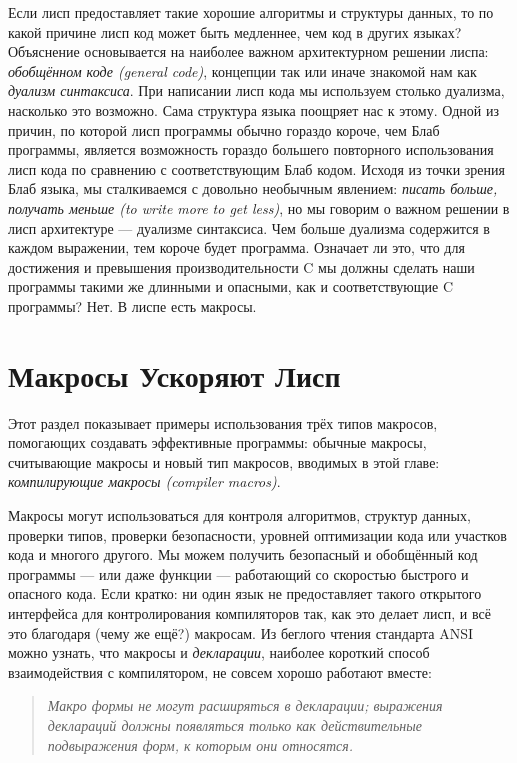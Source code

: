 Если лисп предоставляет такие хорошие алгоритмы и структуры данных, то по какой причине лисп код может быть медленнее, чем код в других языках? Объяснение основывается на наиболее важном архитектурном решении лиспа: \emph{обобщённом коде (general code)}, концепции так или иначе знакомой нам как \emph{дуализм синтаксиса}. При написании лисп кода мы используем столько дуализма, насколько это возможно. Сама структура языка поощряет нас к этому. Одной из причин, по которой лисп программы обычно гораздо короче, чем Блаб программы, является возможность гораздо большего повторного использования лисп кода по сравнению с соответствующим Блаб кодом. Исходя из точки зрения Блаб языка, мы сталкиваемся с довольно необычным явлением: \emph{писать больше, получать меньше (to write more to get less)}, но мы говорим о важном решении в лисп архитектуре --- дуализме синтаксиса. Чем больше дуализма содержится в каждом выражении, тем короче будет программа. Означает ли это, что для достижения и превышения производительности C мы должны сделать наши программы такими же длинными и опасными, как и соответствующие C программы? Нет. В лиспе есть макросы.

\section{Макросы Ускоряют Лисп}\label{section_macros_make_lisp_fast}

Этот раздел показывает примеры использования трёх типов макросов, помогающих создавать эффективные программы: обычные макросы, считывающие макросы и новый тип макросов, вводимых в этой главе: \emph{компилирующие макросы (compiler macros)}.

Макросы могут использоваться для контроля алгоритмов, структур данных, проверки типов, проверки безопасности, уровней оптимизации кода или участков кода и многого другого. Мы можем получить безопасный и обобщённый код программы --- или даже функции --- работающий со скоростью быстрого и опасного кода. Если кратко: ни один язык не предоставляет такого открытого интерфейса для контролирования компиляторов так, как это делает лисп, и всё это благодаря (чему же ещё?) макросам. Из беглого чтения стандарта ANSI можно узнать, что макросы и \emph{декларации}, наиболее короткий способ взаимодействия с компилятором, не совсем хорошо работают вместе:

\begin{quote}
\emph{Макро формы не могут расширяться в декларации; выражения деклараций должны появляться только как действительные подвыражения форм, к которым они относятся.}
\end{quote}


